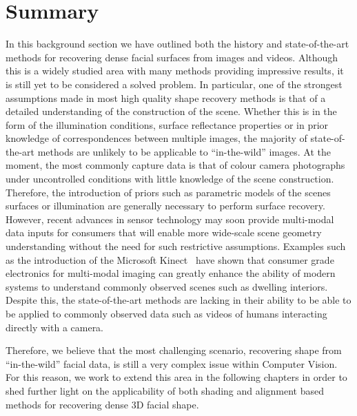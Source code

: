 \section{Summary}\label{sec:bg_summary}
In this background section we have outlined both the history and state-of-the-art
methods for recovering dense facial surfaces from images and videos. Although
this is a widely studied area with many methods providing impressive results,
it is still yet to be considered a solved problem. In particular, one of the
strongest assumptions made in most high quality shape recovery methods is
that of a detailed understanding of the construction of the scene. Whether
this is in the form of the illumination conditions, surface reflectance
properties or in prior knowledge of correspondences between multiple images,
the majority of state-of-the-art methods are unlikely to be applicable to
``in-the-wild'' images. At the moment, the most commonly capture data
is that of colour camera photographs under uncontrolled conditions with
little knowledge of the scene construction. Therefore, the introduction
of priors such as parametric models of the scenes surfaces or illumination
are generally necessary to perform surface recovery. However, recent
advances in sensor technology may soon provide multi-modal data inputs for
consumers that will enable more wide-scale scene geometry understanding
without the need for such restrictive assumptions. Examples such as the
introduction of the Microsoft Kinect~\cite{zhang2012microsoft} have shown
that consumer grade electronics for multi-modal imaging can greatly enhance
the ability of modern systems to understand commonly observed scenes such as
dwelling interiors. Despite this, the state-of-the-art methods are lacking in
their ability to be able to be applied to commonly observed data such as videos
of humans interacting directly with a camera.

Therefore, we believe that the most challenging scenario,
recovering shape from ``in-the-wild'' facial data, is still
a very complex issue within Computer Vision. For this reason, we work to extend
this area in the following chapters in order to shed further light on the
applicability of both shading and alignment based methods for recovering
dense 3D facial shape.
